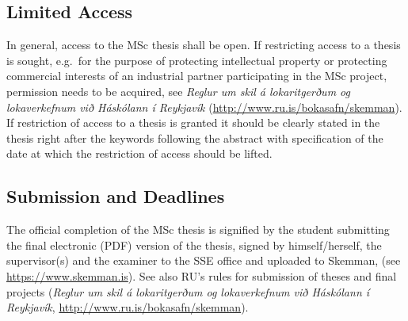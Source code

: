 \subsection{Limited Access}
In general, access to the MSc thesis shall be open.
If restricting access to a thesis is sought, e.g.\ for the purpose of protecting intellectual property or protecting commercial interests of an industrial partner participating in the MSc project, permission needs to be acquired, see {\em Reglur um skil á lokaritgerðum og lokaverkefnum við Háskólann í Reykjavík\/} (\url{http://www.ru.is/bokasafn/skemman}).
If restriction of access to a thesis is granted it should be clearly stated in the thesis right after the keywords following the abstract with specification of the date at which the restriction of access should be lifted.

\subsection{Submission and Deadlines}
The official completion of the MSc thesis is signified by the student submitting the final electronic (PDF) version of the thesis, signed by himself/herself, the supervisor(s) and the examiner to the SSE office and uploaded to Skemman, (see \url{https://www.skemman.is}).
See also RU's rules for submission of theses and final projects ({\em Reglur um skil á lokaritgerðum og lokaverkefnum við Háskólann í Reykjavík\/}, \url{http://www.ru.is/bokasafn/skemman}).

